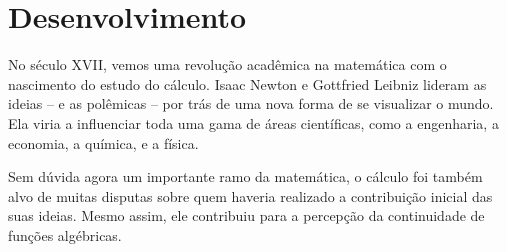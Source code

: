 \documentclass[journal,transmag]{IEEEtran}
\begin{document}
%




\section{Desenvolvimento}
No século XVII, vemos uma revolução acadêmica na matemática com
o nascimento do estudo do cálculo. Isaac Newton e Gottfried Leibniz
lideram as ideias -- e as polêmicas -- por trás de uma nova
forma de se visualizar o mundo. Ela viria a influenciar toda uma
gama de áreas científicas, como a engenharia, a economia,
a química, e a física.

Sem dúvida agora um importante ramo da matemática, o cálculo foi
também alvo de muitas disputas sobre quem haveria realizado a
contribuição inicial das suas ideias. Mesmo assim, ele contribuiu
para a percepção da continuidade de funções algébricas.
\end{document}

